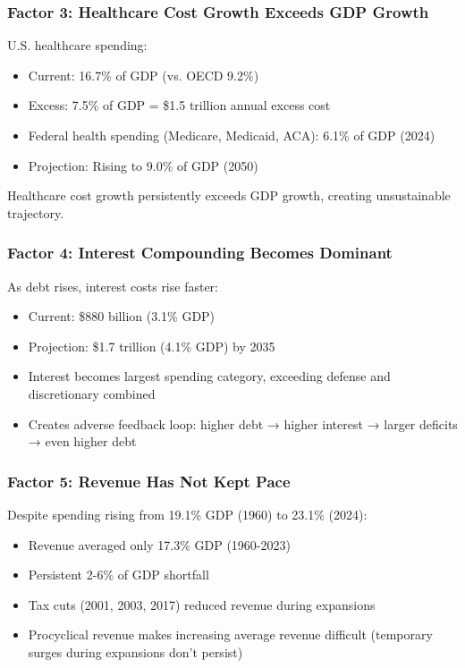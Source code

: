 \documentclass[12pt,letterpaper]{article}
\begin{document}
\subsubsection{Factor 3: Healthcare Cost Growth Exceeds GDP Growth}

U.S. healthcare spending:
\begin{itemize}
    \item Current: 16.7\% of GDP (vs. OECD 9.2\%)
    \item Excess: 7.5\% of GDP = \$1.5 trillion annual excess cost
    \item Federal health spending (Medicare, Medicaid, ACA): 6.1\% of GDP (2024)
    \item Projection: Rising to 9.0\% of GDP (2050)
\end{itemize}

Healthcare cost growth persistently exceeds GDP growth, creating unsustainable trajectory.

\subsubsection{Factor 4: Interest Compounding Becomes Dominant}

As debt rises, interest costs rise faster:
\begin{itemize}
    \item Current: \$880 billion (3.1\% GDP)
    \item Projection: \$1.7 trillion (4.1\% GDP) by 2035
    \item Interest becomes largest spending category, exceeding defense and discretionary combined
    \item Creates adverse feedback loop: higher debt → higher interest → larger deficits → even higher debt
\end{itemize}

\subsubsection{Factor 5: Revenue Has Not Kept Pace}

Despite spending rising from 19.1\% GDP (1960) to 23.1\% (2024):
\begin{itemize}
    \item Revenue averaged only 17.3\% GDP (1960-2023)
    \item Persistent 2-6\% of GDP shortfall
    \item Tax cuts (2001, 2003, 2017) reduced revenue during expansions
    \item Procyclical revenue makes increasing average revenue difficult (temporary surges during expansions don't persist)
\end{itemize}
\end{document}
